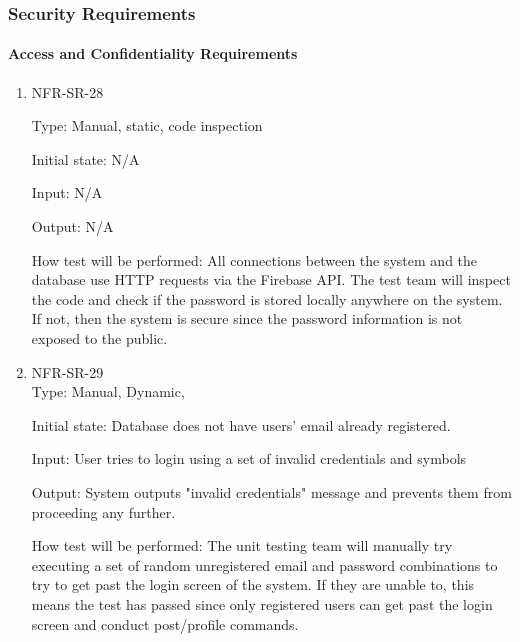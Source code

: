 \documentclass[12pt, titlepage]{article}
\begin{document}
\subsubsection{Security Requirements}
 \paragraph{Access and Confidentiality Requirements}
\begin{enumerate}
    \item{NFR-SR-28\\}
    
    Type: Manual, static, code inspection
    
    Initial state: N/A
    
    Input: N/A
    
    Output: N/A
    
    How test will be performed: All connections between the system and the database use HTTP requests via the Firebase API. The test team will inspect the code and check if the password is stored locally anywhere on the system. If not, then the system is secure since the password information is not exposed to the public.
    
    \item{NFR-SR-29\\}
    Type: Manual, Dynamic, 
    
    Initial state: Database does not have users' email already registered.
    
    Input: User tries to login using a set of invalid credentials and symbols
    
    Output: System outputs "invalid credentials" message and prevents them from proceeding any further.
    
    How test will be performed: The unit testing team will manually try executing a set of random unregistered email and password combinations to try to get past the login screen of the system. If they are unable to, this means the test has passed since only registered users can get past the login screen and conduct post/profile commands.
    
 \end{enumerate} 
 
\end{document}
